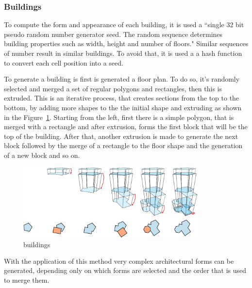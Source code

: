 
\subsubsection{Buildings} %
\label{ssub:buildings}


To compute the form and appearance of each building, it is used a ``single 32 bit pseudo random number generator seed. The random sequence determines building properties such as width, height and number of floors."
Similar sequences of number result in similar buildings. To avoid that, it is used a a hash function to convert each cell position into a seed.

To generate a building is first is generated a floor plan. To do so, it's randomly selected and merged a set of regular polygons and rectangles, then this is extruded. This is an iterative process, that creates sections from the top to the bottom, by adding more shapes to the the initial shape and extruding as shown in the Figure~\ref{fig:UC_buildings}. Starting from the left, first there is a simple polygon, that is merged with a rectangle and after extrusion, forms the first block that will be the top of the building. After that, another extrusion is made to generate the next block followed by the merge of a rectangle to the floor shape and the generation of a new block and so on.

\begin{figure}[htbp]
	\centering
	\includegraphics[width=0.85\textwidth]{img/Real-Time-procedural-generation/Building-Generation.png}
	\caption{buildings}
	\label{fig:UC_buildings}
\end{figure}

With the application of this method very complex architectural forms can be generated, depending only on which forms are selected and the order that is used to merge them.


